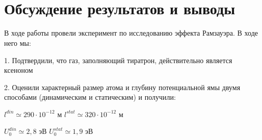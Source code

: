 \documentclass[12pt,a4paper]{article}
\begin{document}
\begin{figure}[H]
\begin{minipage}[h]{0.49\linewidth}
 \\
\end{minipage}
\hfill
\begin{minipage}[h]{0.49\linewidth}
 \\ 
\end{minipage}
\end{figure}


\section{Обсуждение результатов и выводы}
	В ходе работы провели эксперимент по исследованию эффекта Рамзауэра. В ходе него мы:

	1. Подтвердили, что газ, заполняющий тиратрон, действительно является ксеноном
	
	2. Оценили характерный размер атома и глубину потенциальной ямы двумя способами (динамическим и статическим) и получили:
\begin{center}
\begin{large}

$l^{din } \simeq 290 \cdot 10^{-12}$ м \;\;\;\;\;\;\;\; $l^{stat} \simeq 320 \cdot 10^{-12}$ м

$U_0^{din} \simeq 2,8$ эВ \;\;\;\;\;\;\;\; $U_0^{stat} \simeq 1,9$ эВ

\end{large}
\end{center}	
\end{document}
